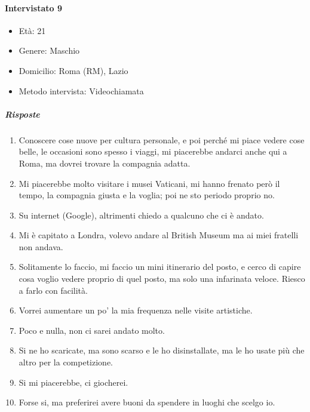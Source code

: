 \documentclass{article}
\begin{document}
\paragraph{Intervistato 9}
\begin{itemize}
\item Età: 21
\item Genere: Maschio
\item Domicilio: Roma (RM), Lazio
\item Metodo intervista: Videochiamata
\end{itemize}
\subparagraph{Risposte}
\begin{enumerate}
\item Conoscere cose nuove per cultura personale, e poi perché mi piace vedere cose belle, le occasioni sono spesso i viaggi, mi piacerebbe andarci anche qui a Roma, ma dovrei trovare la compagnia adatta.
\item Mi piacerebbe molto visitare i musei Vaticani, mi hanno frenato però il tempo, la compagnia giusta e la voglia; poi ne sto periodo proprio no.
\item Su internet (Google), altrimenti chiedo a qualcuno che ci è andato.
\item Mi è capitato a Londra, volevo andare al British Museum ma ai miei fratelli non andava.
\item Solitamente lo faccio, mi faccio un mini itinerario del posto, e cerco di capire cosa voglio vedere proprio di quel posto, ma solo una infarinata veloce. Riesco a farlo con facilità.
\item Vorrei aumentare un po' la mia frequenza nelle visite artistiche.
\item Poco e nulla, non ci sarei andato molto.
\item Si ne ho scaricate, ma sono scarso e le ho disinstallate, ma le ho usate più che altro per la competizione.
\item Si mi piacerebbe, ci giocherei.
\item Forse si, ma preferirei avere buoni da spendere in luoghi che scelgo io.
\end{enumerate}
\end{document}
